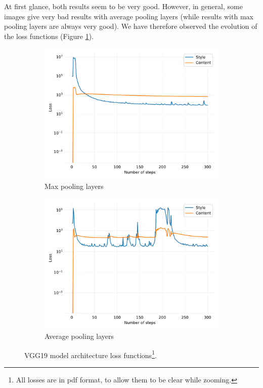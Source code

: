 \documentclass[twocolumn,superscriptaddress,aps,floatfix, nofootinbib]{revtex4-1}
\begin{document}
    At first glance, both results seem to be very good. However, in general, some images give very bad results with average pooling layers (while results with max pooling layers are always very good). We have therefore observed the evolution of the loss functions (Figure \ref{fig:model.architecture.loss}).
    
    \begin{figure}[ht]
        \centering
        \begin{subfigure}[b]{0.22\textwidth}
            \centering
            \includegraphics[width=\textwidth]{resources/pdf/architecture/sun-trees-paris-maxpool.pdf}
            \caption{Max pooling layers}
        \end{subfigure}
        \hfill
        \begin{subfigure}[b]{0.22\textwidth}
            \centering
            \includegraphics[width=\textwidth]{resources/pdf/architecture/sun-trees-paris-avgpool.pdf}
            \caption{Average pooling layers}
        \end{subfigure}
        \caption{VGG19 model architecture loss functions\footnote{All losses are in pdf format, to allow them to be clear while zooming.}.}
        \label{fig:model.architecture.loss}
    \end{figure}
    
\end{document}
